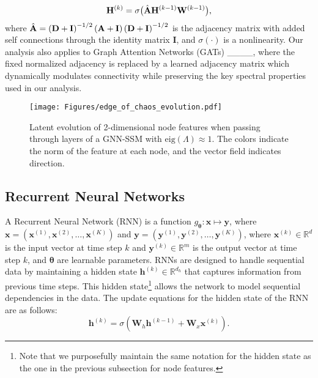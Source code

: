 \begin{equation}
\mathbf{H}^{(k)}=\sigma\big(\Hat{\mathbf{A}}\mathbf{H}^{(k-1)}\mathbf{W}^{(k-1)}\big),
    \label{eq:gcn}
\end{equation}
where $\Hat{\mathbf{A}}=\left(\mathbf{D}+\mathbf{I}\right)^{-1/2} \left(\mathbf{A} + \mathbf{I}\right)\left(\mathbf{D}+\mathbf{I}\right)^{-1/2}$ is the adjacency matrix with added self connections through the identity matrix $\mathbf{I}$, and $\sigma(\cdot)$ is a nonlinearity. Our analysis also applies to Graph Attention Networks (GATs) ____, where the fixed normalized adjacency is replaced by a learned adjacency matrix which dynamically modulates connectivity while preserving the key spectral properties used in our analysis.


\begin{figure}
	\centering
       \texttt{[image: Figures/edge\_of\_chaos\_evolution.pdf]}
       \caption{Latent evolution of 2-dimensional node features when passing through layers of a GNN-SSM with $\text{eig}(\Lambda)\approx 1$. The colors indicate the norm of the feature at each node, and the vector field indicates direction. }
       \label{fig:illustration}
       \vspace{-0.4cm}
\end{figure}
\vspace{-0.2cm}

\subsection{Recurrent Neural Networks}



A Recurrent Neural Network (RNN) is a function $g_{\boldsymbol{\theta}}: \mathbf{x} \mapsto \mathbf{y}$, where  $\mathbf{x} = (\mathbf{x}^{(1)}, \mathbf{x}^{(2)}, \ldots, \mathbf{x}^{(K)})$ and $\mathbf{y} = (\mathbf{y}^{(1)}, \mathbf{y}^{(2)}, \ldots, \mathbf{y}^{(K)})$, where $\mathbf{x}^{(k)} \in \mathbb{R}^d$ is the input vector at time step $k$ and $\mathbf{y}^{(k)} \in \mathbb{R}^m$ is the output vector at time step $k$, and $\boldsymbol{\theta}$ are learnable parameters. RNNs are designed to handle sequential data by maintaining a hidden state $\mathbf{h}^{(k)}\in\mathbb{R}^{d_h}$ that captures information from previous time steps. This hidden state\footnote{Note that we purposefully maintain the same notation for the hidden state as the one in the previous subsection for node features.} allows the network to model sequential dependencies in the data. The update equations for the hidden state of the RNN are as follows:
\begin{equation}
    \mathbf{h}^{(k)} = \sigma(\mathbf{W}_h \mathbf{h}^{(k-1)} + \mathbf{W}_x \mathbf{x}^{(k)}).
    \label{eq:rnn}
\end{equation}

